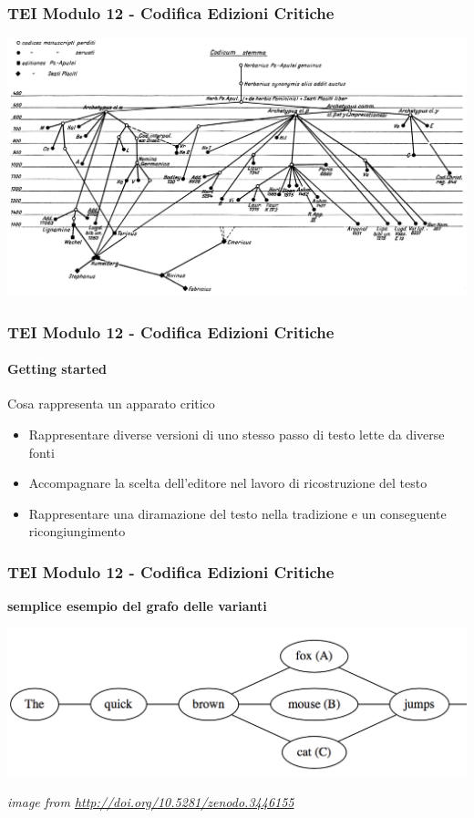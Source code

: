 \begin{frame}
    \frametitle{TEI Modulo 12 - Codifica Edizioni Critiche}
    \addtocounter{nframe}{1}
    
    \begin{center}
        \includegraphics[width=.95\textwidth]{imgs/image.png}
    \end{center}

\end{frame}

\begin{frame}
    \frametitle{TEI Modulo 12 - Codifica Edizioni Critiche}
    \framesubtitle{Getting started}
    \addtocounter{nframe}{1}


    \begin{block}{Cosa rappresenta un apparato critico}
        \begin{itemize}
            \item Rappresentare diverse versioni di uno stesso passo di testo lette da diverse fonti
            \item Accompagnare la scelta dell'editore nel lavoro di ricostruzione del testo
            \item Rappresentare una diramazione del testo nella tradizione e un conseguente ricongiungimento
        \end{itemize}
    \end{block}
       
\end{frame}

\begin{frame}
    \frametitle{TEI Modulo 12 - Codifica Edizioni Critiche}
    \addtocounter{nframe}{1}
    
    \textbf{semplice esempio del grafo delle varianti}

    \begin{center}
        \includegraphics[width=.95\textwidth]{imgs/testo-divergente.png}
    \end{center}

    \textit{image from \url{http://doi.org/10.5281/zenodo.3446155}}

\end{frame}

